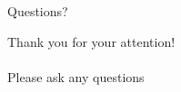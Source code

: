 \documentclass{beamer}
\begin{document}
    

\begin{frame}{Questions?}
    \begin{center}
        \Huge Thank you for your attention! \\ ~ \\ Please ask any questions
    \end{center}
\end{frame}
\end{document}
